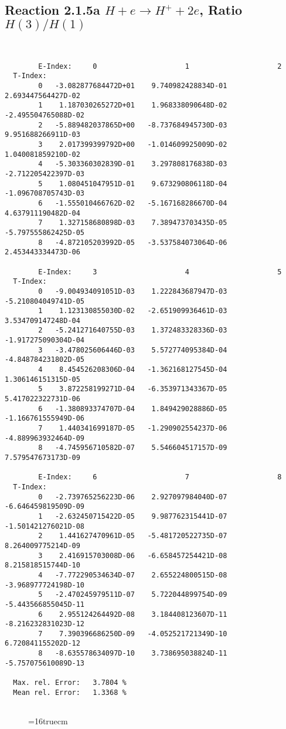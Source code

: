 \documentclass[12pt,dvipdfmx]{article}
\begin{document}
\subsection{
Reaction 2.1.5a  $H + e \rightarrow H^+ + 2e $, Ratio $H(3)/H(1)$
}

\begin{small}\begin{verbatim}


        E-Index:     0                     1                     2
  T-Index:
        0   -3.082877684472D+01    9.740982428834D-01    2.693447564427D-02
        1    1.187030265272D+01    1.968338090648D-02   -2.495504765088D-02
        2   -5.889482037865D+00   -8.737684945730D-03    9.951688266911D-03
        3    2.017399399792D+00   -1.014609925009D-02    1.040081859210D-02
        4   -5.303360302839D-01    3.297808176838D-03   -2.712205422397D-03
        5    1.080451047951D-01    9.673290806118D-04   -1.096708705743D-03
        6   -1.555010466762D-02   -5.167168286670D-04    4.637911190482D-04
        7    1.327158680898D-03    7.389473703435D-05   -5.797555862425D-05
        8   -4.872105203992D-05   -3.537584073064D-06    2.453443334473D-06

        E-Index:     3                     4                     5
  T-Index:
        0   -9.004934091051D-03    1.222843687947D-03   -5.210804049741D-05
        1    1.123130855030D-02   -2.651909936461D-03    3.534709147248D-04
        2   -5.241271640755D-03    1.372483328336D-03   -1.917275090304D-04
        3   -3.478025606446D-03    5.572774095384D-04   -4.848784231802D-05
        4    8.454526208306D-04   -1.362168127545D-04    1.306146151315D-05
        5    3.872258199271D-04   -6.353971343367D-05    5.417022322731D-06
        6   -1.380893374707D-04    1.849429028886D-05   -1.166761555949D-06
        7    1.440341699187D-05   -1.290902554237D-06   -4.889963932464D-09
        8   -4.745956710582D-07    5.546604517157D-09    7.579547673173D-09

        E-Index:     6                     7                     8
  T-Index:
        0   -2.739765256223D-06    2.927097984040D-07   -6.646459819509D-09
        1   -2.632450715422D-05    9.987762315441D-07   -1.501421276021D-08
        2    1.441627470961D-05   -5.481720522735D-07    8.264009775214D-09
        3    2.416915703008D-06   -6.658457254421D-08    8.215818515744D-10
        4   -7.772290534634D-07    2.655224800515D-08   -3.968977724198D-10
        5   -2.470245979511D-07    5.722044899754D-09   -5.443566855045D-11
        6    2.955124264492D-08    3.184408123607D-11   -8.216232831023D-12
        7    7.390396686250D-09   -4.052521721349D-10    6.720841155202D-12
        8   -8.635578634097D-10    3.738695038824D-11   -5.757075610089D-13

  Max. rel. Error:   3.7804 %
  Mean rel. Error:   1.3368 %


\end{verbatim}\end{small}
\begin{figure} \label{2.1.5a}
\epsfxsize=16truecm
\end{figure}
\end{document}
